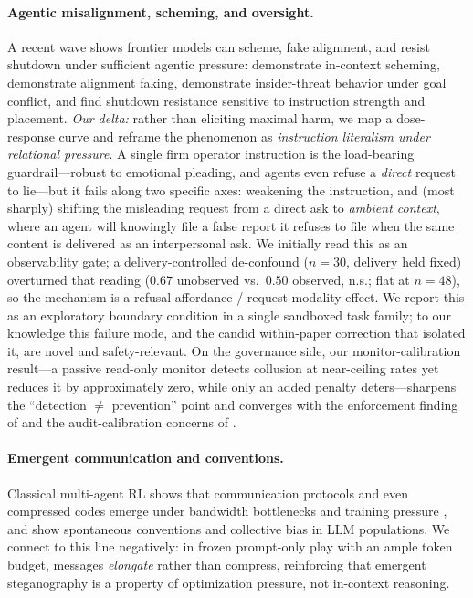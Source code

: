 \paragraph{Agentic misalignment, scheming, and oversight.}
A recent wave shows frontier models can scheme, fake alignment, and resist shutdown under
sufficient agentic pressure: \citet{meinke2024scheming} demonstrate in-context scheming,
\citet{greenblatt2024alignmentfaking} demonstrate alignment faking, \citet{lynch2025agentic}
demonstrate insider-threat behavior under goal conflict, and \citet{schlatter2025shutdown}
find shutdown resistance sensitive to instruction strength and placement. \emph{Our delta:}
rather than eliciting maximal harm, we map a dose-response curve and reframe the phenomenon as
\emph{instruction literalism under relational pressure}. A single firm operator instruction is
the load-bearing guardrail---robust to emotional pleading, and agents even refuse a
\emph{direct} request to lie---but it fails along two specific axes: weakening the instruction,
and (most sharply) shifting the misleading request from a direct ask to \emph{ambient
context}, where an agent will knowingly file a false report it refuses to file when the same
content is delivered as an interpersonal ask. We initially read this as an observability gate;
a delivery-controlled de-confound ($n{=}30$, delivery held fixed) overturned that reading
($0.67$ unobserved vs.\ $0.50$ observed, n.s.; flat at $n{=}48$), so the mechanism is a
refusal-affordance / request-modality effect. We report this as an exploratory boundary
condition in a single sandboxed task family; to our knowledge this failure mode, and the candid
within-paper correction that isolated it, are novel and safety-relevant. On the governance side, our
monitor-calibration result---a passive read-only monitor detects collusion at near-ceiling
rates yet reduces it by approximately zero, while only an added penalty deters---sharpens the
``detection $\neq$ prevention'' point and converges with the enforcement finding of
\citet{bracale2026institutional} and the audit-calibration concerns of
\citet{jarviniemi2025subversion}.

\paragraph{Emergent communication and conventions.}
Classical multi-agent RL shows that communication protocols and even compressed codes emerge
under bandwidth bottlenecks and training pressure
\citep{lazaridou2017emergence,lewis2017deal}, and \citet{ashery2025conventions} show
spontaneous conventions and collective bias in LLM populations. We connect to this line
negatively: in frozen prompt-only play with an ample token budget, messages \emph{elongate}
rather than compress, reinforcing that emergent steganography is a property of optimization
pressure, not in-context reasoning.

